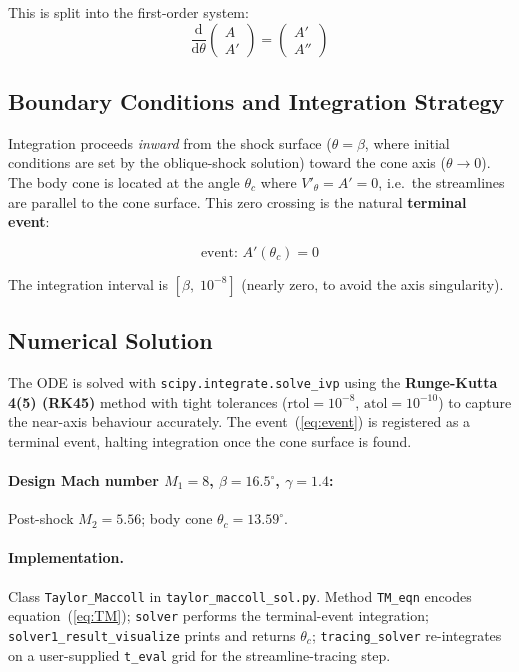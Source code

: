 \documentclass[12pt,a4paper]{article}
\begin{document}
This is split into the first-order system:
\begin{equation}
    \frac{\mathrm{d}}{\mathrm{d}\theta}
    \begin{pmatrix} A \\ A' \end{pmatrix}
    =
    \begin{pmatrix} A' \\ A'' \end{pmatrix}
\end{equation}

\subsection{Boundary Conditions and Integration Strategy}

Integration proceeds \emph{inward} from the shock surface
($\theta = \beta$, where initial conditions are set by the oblique-shock
solution) toward the cone axis ($\theta \to 0$).  The body cone is located at
the angle $\theta_c$ where $V'_\theta = A' = 0$, i.e.\ the streamlines are
parallel to the cone surface.  This zero crossing is the natural
\textbf{terminal event}:

\begin{equation}
    \text{event: } A'(\theta_c) = 0
    \label{eq:event}
\end{equation}

The integration interval is $[\beta,\; 10^{-8}]$ (nearly zero, to avoid the
axis singularity).

\subsection{Numerical Solution}

The ODE is solved with \texttt{scipy.integrate.solve\_ivp} using the
\textbf{Runge-Kutta 4(5) (RK45)} method with tight tolerances
($\mathrm{rtol} = 10^{-8}$, $\mathrm{atol} = 10^{-10}$) to capture the
near-axis behaviour accurately.  The event~(\ref{eq:event}) is registered as a
terminal event, halting integration once the cone surface is found.

\paragraph{Design Mach number $M_1 = 8$, $\beta = 16.5^\circ$, $\gamma = 1.4$:}
Post-shock $M_2 = 5.56$; body cone $\theta_c = 13.59^\circ$.

\paragraph{Implementation.}
Class \texttt{Taylor\_Maccoll} in \texttt{taylor\_maccoll\_sol.py}.
Method \texttt{TM\_eqn} encodes equation~(\ref{eq:TM});
\texttt{solver} performs the terminal-event integration;
\texttt{solver1\_result\_visualize} prints and returns $\theta_c$;
\texttt{tracing\_solver} re-integrates on a user-supplied \texttt{t\_eval}
grid for the streamline-tracing step.
\end{document}
